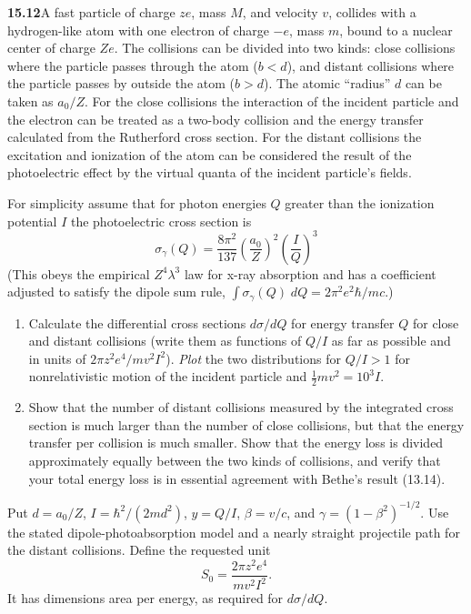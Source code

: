 \par\bigskip
\noindent\textbf{15.12}\quad A fast particle of charge $ze$, mass $M$, and velocity $v$, collides with a hydrogen-like atom with one electron of charge $-e$, mass $m$, bound to a nuclear center of charge $Ze$. The collisions can be divided into two kinds: close collisions where the particle passes through the atom ($b<d$), and distant collisions where the particle passes by outside the atom ($b>d$). The atomic ``radius'' $d$ can be taken as $a_{0}/Z$. For the close collisions the interaction of the incident particle and the electron can be treated as a two-body collision and the energy transfer calculated from the Rutherford cross section. For the distant collisions the excitation and ionization of the atom can be considered the result of the photoelectric effect by the virtual quanta of the incident particle's fields.

For simplicity assume that for photon energies $Q$ greater than the ionization potential $I$ the photoelectric cross section is
\[
\sigma_{\gamma}(Q)=\frac{8\pi^{2}}{137}\left(\frac{a_{0}}{Z}\right)^{2}\!\left(\frac{I}{Q}\right)^{3}
\]
(This obeys the empirical $Z^{4}\lambda^{3}$ law for x-ray absorption and has a coefficient adjusted to satisfy the dipole sum rule, $\int\sigma_{\gamma}(Q)\;dQ=2\pi^{2}e^{2}\hbar/mc$.)
\begin{enumerate}
\item[(a)] Calculate the differential cross sections $d\sigma/dQ$ for energy transfer $Q$ for close and distant collisions (write them as functions of $Q/I$ as far as possible and in units of $2\pi z^{2}e^{4}/mv^{2}I^{2}$). \emph{Plot} the two distributions for $Q/I>1$ for nonrelativistic motion of the incident particle and $\tfrac{1}{2}mv^{2}=10^{3}I$.
\item[(b)] Show that the number of distant collisions measured by the integrated cross section is much larger than the number of close collisions, but that the energy transfer per collision is much smaller. Show that the energy loss is divided approximately equally between the two kinds of collisions, and verify that your total energy loss is in essential agreement with Bethe's result (13.14).
\end{enumerate}
\solution

Put $d=a_0/Z$, $I=\hbar^2/(2md^2)$,
$y=Q/I$, $\beta=v/c$, and $\gamma=(1-\beta^2)^{-1/2}$.
Use the stated dipole-photoabsorption model and a nearly straight
projectile path for the distant collisions.  Define the requested unit
\[
S_0=\frac{2\pi z^2e^4}{mv^2I^2}.
\]
It has dimensions area per energy, as required for $d\sigma/dQ$.

